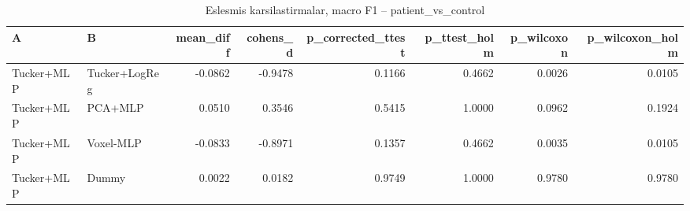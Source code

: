 \begin{table}[htbp]
  \centering
  \caption{Eslesmis karsilastirmalar, macro F1 -- patient\_vs\_control}
  \label{tab:tests_patient_vs_control}
  \small
  \begin{tabular}{llrrrrrr}
    \toprule
    A & B & mean\_diff & cohens\_d & p\_corrected\_ttest & p\_ttest\_holm & p\_wilcoxon & p\_wilcoxon\_holm \\
    \midrule
    Tucker+MLP & Tucker+LogReg & -0.0862 & -0.9478 & 0.1166 & 0.4662 & 0.0026 & 0.0105 \\
    Tucker+MLP & PCA+MLP & 0.0510 & 0.3546 & 0.5415 & 1.0000 & 0.0962 & 0.1924 \\
    Tucker+MLP & Voxel-MLP & -0.0833 & -0.8971 & 0.1357 & 0.4662 & 0.0035 & 0.0105 \\
    Tucker+MLP & Dummy & 0.0022 & 0.0182 & 0.9749 & 1.0000 & 0.9780 & 0.9780 \\
    \bottomrule
  \end{tabular}
\end{table}
